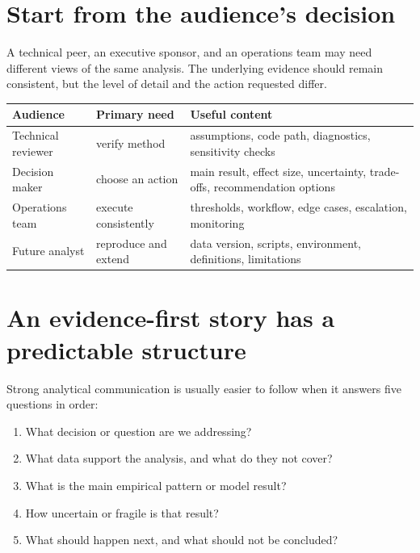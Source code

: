 \section{Start from the audience's decision}
A technical peer, an executive sponsor, and an operations team may need different views of the same analysis. The underlying evidence should remain consistent, but the level of detail and the action requested differ.

\begin{dstable}
\begin{tabularx}{\linewidth}{@{}D{2.8cm}D{3.8cm}Y@{}}
\toprule
{}
\textbf{Audience} & \textbf{Primary need} & \textbf{Useful content} \\
\midrule
Technical reviewer & verify method & assumptions, code path, diagnostics, sensitivity checks \\
Decision maker & choose an action & main result, effect size, uncertainty, trade-offs, recommendation options \\
Operations team & execute consistently & thresholds, workflow, edge cases, escalation, monitoring \\
Future analyst & reproduce and extend & data version, scripts, environment, definitions, limitations \\
\bottomrule
\end{tabularx}
\end{dstable}

\section{An evidence-first story has a predictable structure}
Strong analytical communication is usually easier to follow when it answers five questions in order:
\begin{enumerate}
  \item What decision or question are we addressing?
  \item What data support the analysis, and what do they not cover?
  \item What is the main empirical pattern or model result?
  \item How uncertain or fragile is that result?
  \item What should happen next, and what should not be concluded?
\end{enumerate}


